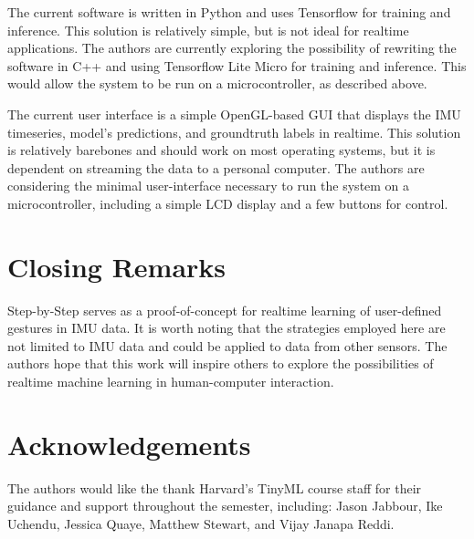 \documentclass{article}
\begin{document}
The current software is written in Python and uses Tensorflow for training and inference. This solution is relatively simple, but is not ideal for realtime applications. The authors are currently exploring the possibility of rewriting the software in C++ and using Tensorflow Lite Micro for training and inference. This would allow the system to be run on a microcontroller, as described above.

The current user interface is a simple OpenGL-based GUI that displays the IMU timeseries, model's predictions, and groundtruth labels in realtime. This solution is relatively barebones and should work on most operating systems, but it is dependent on streaming the data to a personal computer. The authors are considering the minimal user-interface necessary to run the system on a microcontroller, including a simple LCD display and a few buttons for control.


\section{Closing Remarks}
Step-by-Step serves as a proof-of-concept for realtime learning of user-defined gestures in IMU data. It is worth noting that the strategies employed here are not limited to IMU data and could be applied to data from other sensors. The authors hope that this work will inspire others to explore the possibilities of realtime machine learning in human-computer interaction.

\section{Acknowledgements}
The authors would like the thank Harvard's TinyML course staff for their guidance and support throughout the semester, including: Jason Jabbour, Ike Uchendu, Jessica Quaye, Matthew Stewart, and Vijay Janapa Reddi.



\end{document}
